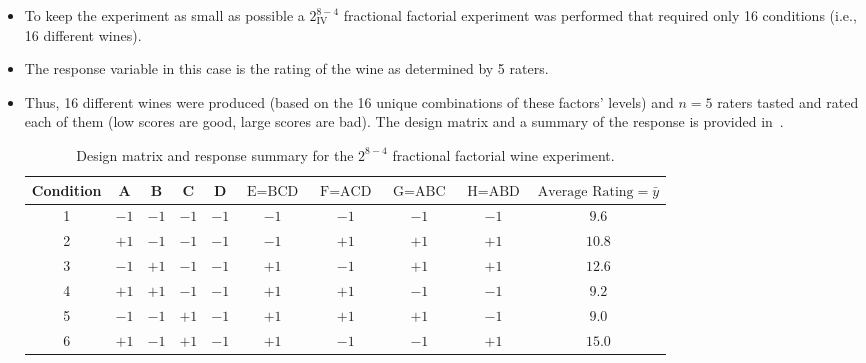 \begin{itemize}
\begin{table}[!htbp]
          \end{table}
    \item To keep the experiment as small as possible a $ 2^{8-4}_{\text{IV}} $ fractional factorial experiment was performed that
          required only 16 conditions (i.e., 16 different wines).
    \item The response variable in this case is the rating of the wine as determined by 5 raters.
    \item Thus, 16 different wines were produced (based on the 16 unique combinations of these factors' levels)
          and $n = 5$ raters tasted and rated each of them (low scores are good, large scores are bad). The design
          matrix and a summary of the response is provided in~.
          \begin{table}[!htbp]
              \centering
              \caption{Design matrix and response summary for the $2^{8-4}$ fractional factorial wine experiment.}\label{tab:wine2}
              \begin{tabular}{cccccccccc}
                  \toprule
                  Condition & A    & B    & C    & D    & $\text{E}=\text{BCD}$ & $\text{F}=\text{ACD}$ & $\text{G}=\text{ABC}$ & $\text{H}=\text{ABD}$ & $\text{Average Rating}=\bar{y}$ \\
                  \midrule
                  1         & $-1$ & $-1$ & $-1$ & $-1$ & $-1$                  & $-1$                  & $-1$                  & $-1$                  & $9.6$                           \\
                  2         & $+1$ & $-1$ & $-1$ & $-1$ & $-1$                  & $+1$                  & $+1$                  & $+1$                  & $10.8$                          \\
                  3         & $-1$ & $+1$ & $-1$ & $-1$ & $+1$                  & $-1$                  & $+1$                  & $+1$                  & $12.6$                          \\
                  4         & $+1$ & $+1$ & $-1$ & $-1$ & $+1$                  & $+1$                  & $-1$                  & $-1$                  & $9.2$                           \\
                  5         & $-1$ & $-1$ & $+1$ & $-1$ & $+1$                  & $+1$                  & $+1$                  & $-1$                  & $9.0$                           \\
                  6         & $+1$ & $-1$ & $+1$ & $-1$ & $+1$                  & $-1$                  & $-1$                  & $+1$                  & $15.0$                          \\

\end{tabular}
\end{table}
\end{itemize}
